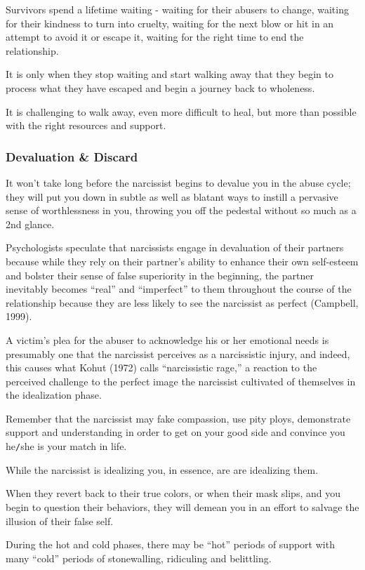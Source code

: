 \documentclass[oneside]{book}
\numberwithin{equation}{section}
\begin{document}
%
Survivors spend a lifetime waiting - waiting for their abusers to change, waiting for their kindness to turn into cruelty, waiting for the next blow or hit in an attempt to avoid it or escape it, waiting for the right time to end the relationship.

It is only when they stop waiting and start walking away that they begin to process what they have escaped and begin a journey back to wholeness.

It is challenging to walk away, even more difficult to heal, but more than possible with the right resources and support.

\subsubsection{Devaluation \& Discard}
It won't take long before the narcissist begins to devalue you in the abuse cycle; they will put you down in subtle as well as blatant ways to instill a pervasive sense of worthlessness in you, throwing you off the pedestal without so much as a 2nd glance.

Psychologists speculate that narcissists engage in devaluation of their partners because while they rely on their partner's ability to enhance their own self-esteem and bolster their sense of false superiority in the beginning, the partner inevitably becomes ``real'' and ``imperfect'' to them throughout the course of the relationship because they are less likely to see the narcissist as perfect (Campbell, 1999).

A victim's plea for the abuser to acknowledge his or her emotional needs is presumably one that the narcissist perceives as a narcissistic injury, and indeed, this causes what Kohut (1972) calls ``narcissistic rage,'' a reaction to the perceived challenge to the perfect image the narcissist cultivated of themselves in the idealization phase.

%
Remember that the narcissist may fake compassion, use pity ploys, demonstrate support and understanding in order to get on your good side and convince you he\texttt{/}she is your match in life.

While the narcissist is idealizing you, in essence, are are idealizing them.

When they revert back to their true colors, or when their mask slips, and you begin to question their behaviors, they will demean you in an effort to salvage the illusion of their false self.

%
During the hot and cold phases, there may be ``hot'' periods of support with many ``cold'' periods of stonewalling, ridiculing and belittling.
\end{document}
